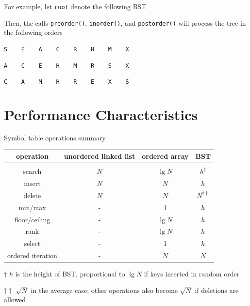 \documentclass[8pt,a4paper,compress]{beamer}
\begin{document}
\begin{frame}[fragile]
\pause

For example, let \lstinline{root} denote the following BST
\begin{center}
\end{center}

\pause
\bigskip

Then, the calls \lstinline{preorder()}, \lstinline{inorder()}, and \lstinline{postorder()} will process the tree in the following orders

\begin{center}
\lstinline{S    E    A    C    R    H    M    X}

\bigskip

\lstinline{A    C    E    H    M    R    S    X}

\bigskip

\lstinline{C    A    M    H    R    E    X    S}
\end{center}
\end{frame}

\section{Performance Characteristics}
\begin{frame}[fragile]
\pause

Symbol table operations summary
\begin{center}
\begin{tabular}{cccc}
operation & unordered linked list & ordered array & BST \\ \hline \\
search & $N$ & $\lg N$ & $h^\dagger$ \\
insert & $N$ & $N$ & $h$ \\
delete & $N$ & $N$ & $N^{\dagger\dagger}$ \\
min/max & - & 1 & $h$ \\
floor/ceiling & - & $\lg N$ & $h$\\
rank & - & $\lg N$ & $h$ \\
select & - & 1 & $h$ \\
ordered iteration & - & $N$ & $N$ 
\end{tabular} 

\bigskip

\tiny $\dagger$ $h$ is the height of BST, proportional to $\lg N$ if keys inserted in random order

$\dagger\dagger$ $\sqrt{N}$ in the average case; other operations also become $\sqrt{N}$ if deletions are allowed
\end{center}
\end{frame}
\end{document}
